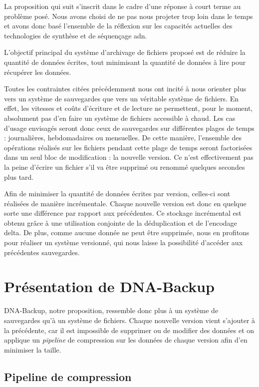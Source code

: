 \documentclass[a4paper]{report}
\begin{document}
La proposition qui suit s'inscrit dans le cadre d'une réponse à court terme au problème posé.
Nous avons choisi de ne pas nous projeter trop loin dans le temps et avons donc basé l'ensemble de la réflexion sur les capacités actuelles des technologies de synthèse et de séquençage \ac{adn}.

L'objectif principal du système d'archivage de fichiers proposé est de réduire la quantité de données écrites, tout minimisant la quantité de données à lire pour récupérer les données.

Toutes les contraintes citées précédemment nous ont incité %
à nous orienter plus vers un système de sauvegardes que vers un véritable système de fichiers.
En effet, les vitesses et coûts d'écriture et de lecture ne permettent, pour le moment,
absolument pas d'en faire un système de fichiers accessible à chaud.
Les cas d'usage envisagés seront donc ceux de sauvegardes sur différentes plages de temps :
journalières, hebdomadaires ou mensuelles.
De cette manière, l'ensemble des opérations réalisés sur les fichiers pendant cette plage de temps
seront factorisées dans un seul bloc de modification : la nouvelle version.
Ce n'est effectivement pas la peine d'écrire un fichier s'il va être supprimé ou renommé quelques secondes plus tard.

Afin de minimiser la quantité de données écrites par version, celles-ci sont réalisées de manière incrémentale.
Chaque nouvelle version est donc en quelque sorte une différence par rapport aux précédentes.
Ce stockage incrémental est obtenu grâce à une utilisation conjointe de la déduplication et de l'encodage delta.
De plus, comme aucune donnée ne peut être supprimée, nous en profitons pour réaliser un système versionné, qui nous laisse la possibilité d'accéder aux précédentes sauvegardes.


\chapter{Présentation de DNA-Backup}

DNA-Backup, notre proposition, ressemble donc plus à un système de sauvegardes qu'à un système de fichiers.
Chaque nouvelle version vient s'ajouter à la précédente, car il est impossible de supprimer ou de modifier des données
et on applique un \emph{pipeline} de compression sur les données de chaque version afin d'en minimiser la taille.

\section{Pipeline de compression}
\end{document}
